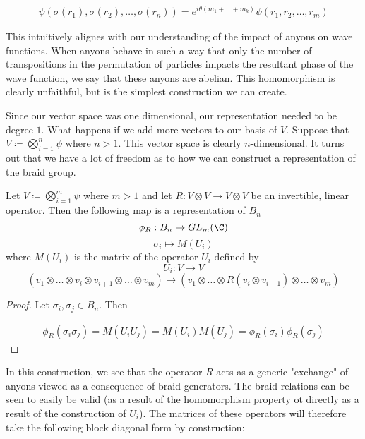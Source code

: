\begin{equation}
	\begin{aligned}
		\psi(\sigma(r_1),\sigma(r_2),\hdots,\sigma(r_n)) = e^{i\theta(m_1+\hdots+m_k)} \psi(r_1,r_2,\hdots,r_m)
	\end{aligned}
\end{equation}

This intuitively alignes with our understanding of the impact of anyons on wave functions. When anyons behave in such a way that only the number of transpositions in the permutation of particles impacts the resultant phase of the wave function, we say that these anyons are abelian. This homomorphism is clearly unfaithful, but is the simplest construction we can create.

Since our vector space was one dimensional, our representation needed to be degree $1$. What happens if we add more vectors to our basis of $V$. Suppose that $V \coloneq \bigotimes_{i=1}^n\psi$ where $n>1$. This vector space is clearly $n$-dimensional. It turns out that we have a lot of freedom as to how we can construct a representation of the braid group.

\begin{theorem}
	Let $V \coloneq \bigotimes_{i=1}^m\psi$ where $m>1$ and let $R: V\otimes V \rightarrow V\otimes V $ be an invertible, linear operator. Then the following map is a representation of $B_n$
$$\phi_R:B_n\rightarrow GL_m(\C)$$
$$\sigma_i \mapsto M(U_i)$$
where $M(U_i)$ is the matrix of the operator $U_i$ defined by
$$U_i:V\rightarrow V$$
$$(v_1\otimes\hdots\otimes v_i\otimes v_{i+1}\otimes\hdots\otimes v_m)\mapsto (v_1\otimes\hdots\otimes R(v_i\otimes v_{i+1})\otimes\hdots\otimes v_m)$$
\end{theorem}

\noindent \begin{proof} Let $\sigma_i,\sigma_j\in B_n$. Then

\begin{equation}
	\begin{aligned}
		\phi_R(\sigma_i\sigma_j) = M(U_iU_j) = M(U_i)M(U_j) =  \phi_R(\sigma_i)\phi_R(\sigma_j)
	\end{aligned}
\end{equation}
 \end{proof}

In this construction, we see that the operator $R$ acts as a generic "exchange" of anyons viewed as a consequence of braid generators. The braid relations can be seen to easily be valid (as a result of the homomorphism property ot directly as a result of the construction of $U_i$). The matrices of these operators will therefore take the following block diagonal form by construction:

